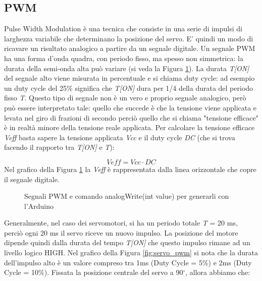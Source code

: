 \documentclass[12pt]{report}
\begin{document}
%
\subsection{PWM}
%

Pulse Width Modulation è una tecnica che consiste in una serie di impulsi di larghezza variabile che determinano la posizione del servo. E' quindi un modo di ricavare un risultato analogico a partire da un segnale digitale. Un segnale PWM ha una forma d'onda quadra, con periodo fisso, ma spesso non simmetrica: la durata della semi-onda alta può variare (si veda la Figura \ref{fig:pwm}). La durata \textit{T[ON]} del segnale alto viene misurata in percentuale e si chiama duty cycle: ad esempio un duty cycle del 25\% significa che \textit{T[ON]} dura per 1/4 della durata del periodo fisso \textit{T}. Questo tipo di segnale non è un vero e proprio segnale analogico, però può essere interpretato tale: quello che succede è che la tensione viene applicata e levata nel giro di frazioni di secondo perciò quello che si chiama "tensione efficace" è in realtà minore della tensione reale applicata. Per calcolare la tensione efficace \textit{Veff} basta sapere la tensione applicata \textit{Vcc} e il duty cycle \textit{DC} (che si trova facendo il rapporto tra \textit{T[ON]} e \textit{T}):

%
\[Veff = Vcc \cdot DC\]
%
Nel grafico della Figura \ref{fig:pwm} la \textit{Veff} è rappresentata dalla linea orizzontale che copre il segnale digitale.

\begin{figure}
	\caption{Segnali PWM e comando analogWrite(int value) per generarli con l'Arduino}
	\label{fig:pwm}
\end{figure}

Generalmente, nel caso dei servomotori, si ha un periodo totale \textit{T} = 20 ms, perciò ogni 20 ms il servo riceve un nuovo impulso. La posizione del motore dipende quindi dalla durata del tempo \textit{T[ON]} che questo impulso rimane ad un livello logico HIGH. Nel grafico della Figura \ref{fig:servo_pwm} si nota che la durata dell'impulso alto è un valore compreso tra 1ms (Duty Cycle = 5\%) e 2ms (Duty Cycle = 10\%). Fissata la posizione centrale del servo a 90$^{\circ}$, allora abbiamo che: 
\end{document}
